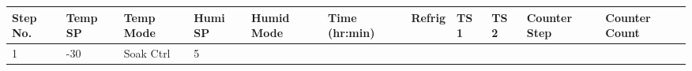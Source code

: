 \begin{longtable}[]{@{}lllllllllll@{}}
\toprule
\begin{minipage}[b]{0.09\columnwidth}\raggedright
Step No.\strut
\end{minipage} & \begin{minipage}[b]{0.05\columnwidth}\raggedright
Temp SP\strut
\end{minipage} & \begin{minipage}[b]{0.09\columnwidth}\raggedright
Temp Mode\strut
\end{minipage} & \begin{minipage}[b]{0.06\columnwidth}\raggedright
Humi SP\strut
\end{minipage} & \begin{minipage}[b]{0.06\columnwidth}\raggedright
Humid Mode\strut
\end{minipage} & \begin{minipage}[b]{0.12\columnwidth}\raggedright
Time (hr:min)\strut
\end{minipage} & \begin{minipage}[b]{0.08\columnwidth}\raggedright
Refrig\strut
\end{minipage} & \begin{minipage}[b]{0.04\columnwidth}\raggedright
TS 1\strut
\end{minipage} & \begin{minipage}[b]{0.05\columnwidth}\raggedright
TS 2\strut
\end{minipage} & \begin{minipage}[b]{0.03\columnwidth}\raggedright
Counter Step\strut
\end{minipage} & \begin{minipage}[b]{0.03\columnwidth}\raggedright
Counter Count\strut
\end{minipage}\tabularnewline
\midrule
\endhead
\begin{minipage}[t]{0.09\columnwidth}\raggedright
1\strut
\end{minipage} & \begin{minipage}[t]{0.05\columnwidth}\raggedright
-30\strut
\end{minipage} & \begin{minipage}[t]{0.09\columnwidth}\raggedright
Soak Ctrl\strut
\end{minipage} & \begin{minipage}[t]{0.06\columnwidth}\raggedright
5\strut
\end{minipage} & \begin{minipage}[t]{0.06\columnwidth}\raggedright

\end{minipage}
\end{longtable}
